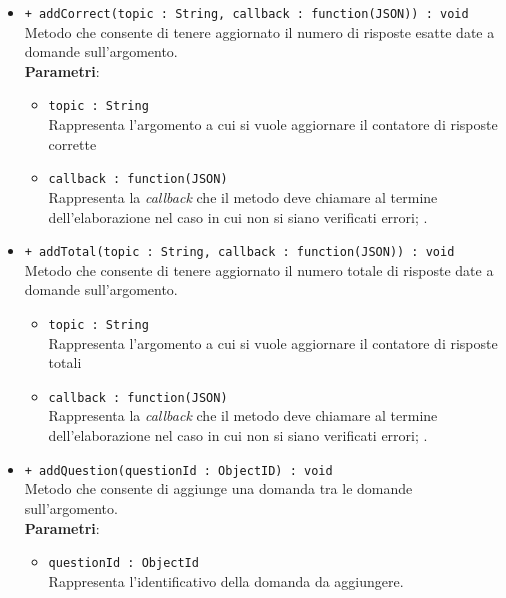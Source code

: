 \begin{itemize}
\begin{itemize}
			\item \texttt{+ addCorrect(topic : String, callback : function(JSON)) : void} \\
			Metodo che consente di tenere aggiornato il numero di risposte esatte date a domande sull'argomento.\\
			\textbf{Parametri}:
			\begin{itemize}
				\item \texttt{topic : String} \\
				Rappresenta l'argomento a cui si vuole aggiornare il contatore di risposte corrette
				\item \texttt{callback : function(JSON)} \\
				Rappresenta la \textit{callback} che il metodo deve chiamare al termine dell'elaborazione nel caso in cui non si siano verificati errori;	.
			\end{itemize}
			\item \texttt{+ addTotal(topic : String, callback : function(JSON)) : void} \\
			Metodo che consente di tenere aggiornato il numero totale di risposte date a domande sull'argomento.\\
			\begin{itemize}
				\item \texttt{topic : String} \\
				Rappresenta l'argomento a cui si vuole aggiornare il contatore di risposte totali
				\item \texttt{callback : function(JSON)} \\
				Rappresenta la \textit{callback} che il metodo deve chiamare al termine dell'elaborazione nel caso in cui non si siano verificati errori;	.
			\end{itemize}
			
			\item \texttt{+ addQuestion(questionId : ObjectID) : void} \\
			Metodo che consente di aggiunge una domanda tra le domande sull'argomento. \\
			\textbf{Parametri}:
			\begin{itemize}
				\item \texttt{questionId : ObjectId} \\
				Rappresenta l'identificativo della domanda da aggiungere.
			\end{itemize}
			

\end{itemize}
\end{itemize}
